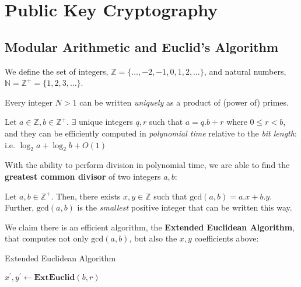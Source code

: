 \setcounter{chapter}{3}
\setcounter{lecture}{18}
\chapter{Public Key Cryptography}
\section{Modular Arithmetic and Euclid's Algorithm}
We define the set of integers, \( \mathbb{Z} = \{ \ldots, -2, -1, 0, 1, 2, \ldots \} \), 
and natural numbers, \( \mathbb{N} = \mathbb{Z}^+ = \{ 1, 2, 3, \ldots \} \).

\begin{theorem}\label{ProductOfPrimes}
	Every integer \( N > 1 \) can be written \emph{uniquely} as
	a product of (power of) primes.
\end{theorem}

\begin{lemma}\label{DivisionWithRemainder}
	Let \( a \in \mathbb{Z}, b \in \mathbb{Z}^+ \). $\exists$ unique
	integers $q, r$ such that \( a = q . b + r \) where \( 0 \leq r < b \),    
	and they can be efficiently computed in \emph{polynomial time}
	relative to the \emph{bit length}: i.e. \( \log_2 a + \log_2 b + O(1) \) 
\end{lemma}

With the ability to perform division in polynomial time, we are able
to find the \textbf{greatest common divisor} of two integers $a, b$:

\begin{definition}\label{gcd}
	Let \( a, b \in \mathbb{Z}^+ \). Then, there exists \( x, y \in 
	\mathbb{Z} \) such that \( \text{gcd}(a, b) = a.x  + b.y \).   
	Further, \( \text{gcd}(a, b) \) is the \emph{smallest} positive integer
	that can be written this way. 
\end{definition}

We claim there is an efficient algorithm, the \textbf{Extended Euclidean Algorithm},
that computes not only \( \text{gcd}(a, b) \), but also the \( x, y \) coefficients above:

\begin{algorithm}[H]\label{eea}
	\DontPrintSemicolon
	\caption{Extended Euclidean Algorithm}
	\(x^{\prime}, y^{\prime} \gets \mathbf{ExtEuclid}(b, r) \)\; 
	\;
\end{algorithm}

